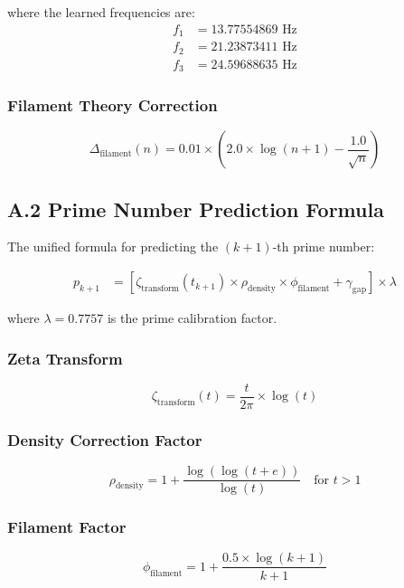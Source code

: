 where the learned frequencies are:
\begin{align}
f_1 &= 13.77554869 \text{ Hz} \nonumber \\
f_2 &= 21.23873411 \text{ Hz} \nonumber \\
f_3 &= 24.59688635 \text{ Hz} \label{eq:learned_frequencies}
\end{align}

\subsubsection*{Filament Theory Correction}
\begin{equation}
\Delta_{\text{filament}}(n) = 0.01 \times \left(2.0 \times \log(n+1) - \frac{1.0}{\sqrt{n}}\right) \label{eq:filament_correction}
\end{equation}

\subsection*{A.2 Prime Number Prediction Formula}

The unified formula for predicting the $(k+1)$-th prime number:

\begin{align}
p_{k+1} &= \left[\zeta_{\text{transform}}(t_{k+1}) \times \rho_{\text{density}} \times \phi_{\text{filament}} + \gamma_{\text{gap}}\right] \times \lambda \label{eq:prime_complete}
\end{align}

where $\lambda = 0.7757$ is the prime calibration factor.

\subsubsection*{Zeta Transform}
\begin{equation}
\zeta_{\text{transform}}(t) = \frac{t}{2\pi} \times \log(t) \label{eq:zeta_transform}
\end{equation}

\subsubsection*{Density Correction Factor}
\begin{equation}
\rho_{\text{density}} = 1 + \frac{\log(\log(t+e))}{\log(t)} \quad \text{for } t > 1 \label{eq:density_factor}
\end{equation}

\subsubsection*{Filament Factor}
\begin{equation}
\phi_{\text{filament}} = 1 + \frac{0.5 \times \log(k+1)}{k+1} \label{eq:filament_factor}
\end{equation}


